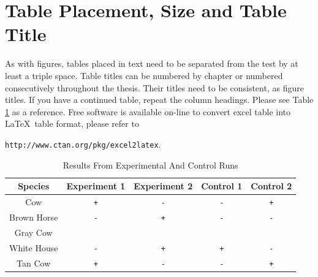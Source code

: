 \section{Table Placement, Size and Table Title}
As with figures, tables placed in text need to be separated from the test by at least a triple space. Table titles can be numbered by chapter or numbered consecutively throughout the thesis. Their titles need to be consistent, as figure titles. If you have a continued table, repeat the column headings. Please see Table \ref{tab:exampleA} %
as a reference. Free software is available on-line to convert excel table into \LaTeX ~table format, please refer to 

\verb|http://www.ctan.org/pkg/excel2latex|.

\begin{table}[h]
	\begin{center}
	\caption{Results From Experimental And Control Runs}
	\label{tab:exampleA}
	\begin{tabular}{||c|c|c|c|c||}		
		\hline
		Species  	&  	Experiment 1	&  Experiment 2  	&  	Control 1 	& 	Control 2	\\	\hline
		Cow	   	&  	\verb|+|	&  \verb|-|		&	\verb|-|	&	\verb|+|	\\	\hline
		Brown Horse	&	\verb|-|	&	\verb|+|	&	\verb|-|	&	\verb|-|	\\	\hline
		Gray Cow	&			&			&			&			\\	\hline
		White House	&	\verb|-|	&	\verb|+|	&	\verb|+|	&	\verb|-|	\\	\hline
		Tan Cow	&	\verb|+|	&	\verb|-|	&	\verb|-|	&	\verb|+|		\\	\hline
	\end{tabular}
	\end{center}
\end{table}


